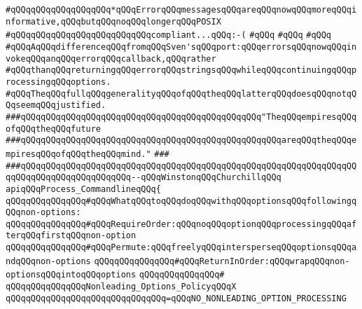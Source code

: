 \verb|#qQQqqQQqqQQqqQQqqQQq*qQQqErrorqQQqmessagesqQQqareqQQqnowqQQqmoreqQQqinformative,qQQqbutqQQqnoqQQqlongerqQQqPOSIX|\newline
\verb|#qQQqqQQqqQQqqQQqqQQqqQQqqQQqcompliant...qQQq:-(|\newline
\verb|#qQQq|\newline
\verb|#qQQq|\newline
\verb|#qQQq|\newline
\verb|#qQQqAqQQqdifferenceqQQqfromqQQqSven'sqQQqport:qQQqerrorsqQQqnowqQQqinvokeqQQqanqQQqerrorqQQqcallback,qQQqrather|\newline
\verb|#qQQqthanqQQqreturningqQQqerrorqQQqstringsqQQqwhileqQQqcontinuingqQQqprocessingqQQqoptions.|\newline
\verb|#qQQqTheqQQqfullqQQqgeneralityqQQqofqQQqtheqQQqlatterqQQqdoesqQQqnotqQQqseemqQQqjustified.|\newline
\newline
\newline
\verb|###qQQqqQQqqQQqqQQqqQQqqQQqqQQqqQQqqQQqqQQqqQQqqQQq"TheqQQqempiresqQQqofqQQqtheqQQqfuture|\newline
\verb|###qQQqqQQqqQQqqQQqqQQqqQQqqQQqqQQqqQQqqQQqqQQqqQQqqQQqareqQQqtheqQQqempiresqQQqofqQQqtheqQQqmind."|\newline
\verb|###|\newline
\verb|###qQQqqQQqqQQqqQQqqQQqqQQqqQQqqQQqqQQqqQQqqQQqqQQqqQQqqQQqqQQqqQQqqQQqqQQqqQQqqQQqqQQqqQQqqQQq--qQQqWinstonqQQqChurchillqQQq|\newline
\newline
\newline
\verb|apiqQQqProcess_CommandlineqQQq{|\newline
\newline
\verb|qQQqqQQqqQQqqQQq#qQQqWhatqQQqtoqQQqdoqQQqwithqQQqoptionsqQQqfollowingqQQqnon-options:|\newline
\verb|qQQqqQQqqQQqqQQq#qQQqRequireOrder:qQQqnoqQQqoptionqQQqprocessingqQQqafterqQQqfirstqQQqnon-option|\newline
\verb|qQQqqQQqqQQqqQQq#qQQqPermute:qQQqfreelyqQQqintersperseqQQqoptionsqQQqandqQQqnon-options|\newline
\verb|qQQqqQQqqQQqqQQq#qQQqReturnInOrder:qQQqwrapqQQqnon-optionsqQQqintoqQQqoptions|\newline
\verb|qQQqqQQqqQQqqQQq#|\newline
\verb|qQQqqQQqqQQqqQQqNonleading_Options_PolicyqQQqX|\newline
\verb|qQQqqQQqqQQqqQQqqQQqqQQqqQQqqQQq=qQQqNO_NONLEADING_OPTION_PROCESSING|\newline
